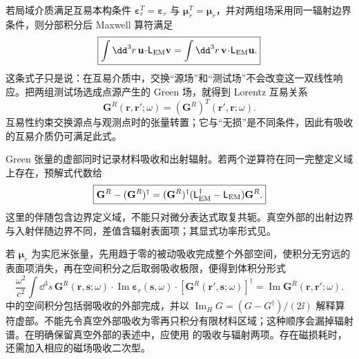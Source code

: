 若局域介质满足互易本构条件
$\boldsymbol\varepsilon_r^T=\boldsymbol\varepsilon_r$ 与
$\boldsymbol\mu_r^T=\boldsymbol\mu_r$，并对两组场采用同一辐射边界条件，则分部积分后 Maxwell 算符满足
\begin{equation}
\boxed{
\int\dd^3 r\,\mathbf u\!\cdot\!\mathsf L_{\rm EM}\mathbf v
=\int\dd^3 r\,\mathbf v\!\cdot\!\mathsf L_{\rm EM}\mathbf u.}
\label{eq:maxwell-bilinear-reciprocity-dp68}
\end{equation}
这条式子只是说：在互易介质中，交换“源场”和“测试场”不会改变这一双线性响应。把两组测试场选成点源产生的 Green 场，就得到 Lorentz 互易关系
\begin{equation}
 \boxed{
 \mathbf G^R(\mathbf r,\mathbf r';\omega)
 =(\mathbf G^R)^T(\mathbf r',\mathbf r;\omega).}
 \label{eq:maxwell-green-reciprocity-r16}\end{equation}
互易性约束交换源点与观测点时的张量转置；它与“无损”是不同条件，因此有吸收的互易介质仍可满足此式。

Green 张量的虚部同时记录材料吸收和出射辐射。若两个逆算符在同一完整定义域上存在，预解式代数给
\begin{equation}
 \boxed{
 \mathbf G^R-(\mathbf G^R)^\dagger
 =(\mathbf G^R)^\dagger
 (\mathsf L_{\rm EM}^\dagger-\mathsf L_{\rm EM})
 \mathbf G^R.}
 \label{eq:resolvent-imag-identity-r12}
\end{equation}
这里的伴随包含边界定义域，不能只对微分表达式取复共轭。真空外部的出射边界与入射伴随边界不同，差值含辐射表面项；其显式功率形式见。

若 $\boldsymbol\mu_r$ 为实厄米张量，先用趋于零的被动吸收完成整个外部空间，使积分无穷远的表面项消失，再在空间积分之后取弱吸收极限，便得到体积分形式
\begin{equation}
 \boxed{
 \frac{\omega^2}{c^2}
 \int\dd^3 s\,
 \mathbf G^R(\mathbf r,\mathbf s;\omega)
 \cdot\operatorname{Im}\boldsymbol\varepsilon_r(\mathbf s,\omega)
 \cdot[\mathbf G^R(\mathbf r',\mathbf s;\omega)]^\dagger
 =\operatorname{Im}\mathbf G^R(\mathbf r,\mathbf r';\omega).}
 \label{eq:green-optical-identity-SI-r12}
\end{equation}
 中的空间积分包括弱吸收的外部完成，并以 $\operatorname{Im}_{H}G=(G-G^\dagger)/(2\ii)$ 解释算符虚部。不能先令真空外部吸收为零再只积分有限材料区域；这种顺序会漏掉辐射谱。在明确保留真空外部的表述中，应使用 的吸收与辐射两项。存在磁损耗时，还需加入相应的磁场吸收二次型。
